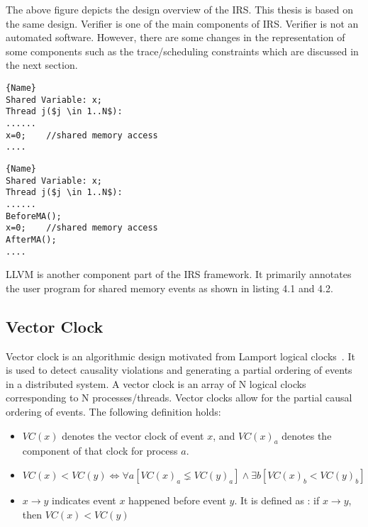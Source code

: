 The above figure depicts the design overview of the IRS. 
This thesis is based on the same design.  
Verifier is one of the main components of IRS. 
Verifier is not an automated software.
However, there are some changes in the representation of some components such as the trace/scheduling constraints which are discussed in the next section. 
\\
\noindent\begin{minipage}{.45\textwidth}
\begin{lstlisting}[mathescape=true,style=customc,caption=Uninstrumented User Program,frame=tlrb]{Name}
Shared Variable: x;
Thread j($j \in 1..N$): 
......
x=0;	//shared memory access
....
\end{lstlisting}
\label{uninstr_usr_pgm}
\end{minipage}\hfill
\begin{minipage}{.45\textwidth}
\begin{lstlisting}[mathescape=true,style=customc,caption=Instrumented User Program,frame=tlrb]{Name}
Shared Variable: x;
Thread j($j \in 1..N$): 
......
BeforeMA();
x=0;	//shared memory access
AfterMA();
....
\end{lstlisting}
\label{instr_usr_pgm}
\end{minipage}

LLVM is another component part of the IRS framework. 
It primarily annotates the user program for shared memory events as shown in listing 4.1 and 4.2. 

\subsection{Vector Clock}

Vector clock is an algorithmic design motivated from Lamport logical clocks~\citep{fidge1991logical}. 
It is used to detect causality violations and generating a partial ordering of events in a distributed system. 
A vector clock is an array of N logical clocks corresponding to N processes/threads. 
Vector clocks allow for the partial causal ordering of events.
The following definition holds:
\begin{itemize}
\item $VC(x)$ denotes the vector clock of event $x$, and $VC(x)_a$ denotes the component of that clock for process $a$. 
\item $VC(x) < VC(y) \iff \forall a[VC(x)_a \lneq VC(y)_a] \wedge \exists b[VC(x)_b < VC(y)_b]$
\item $x \to y$ indicates event $x$ happened before event $y$. It is defined as : if $x \to y$, then $VC(x) < VC(y)$
\end{itemize}

